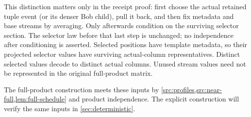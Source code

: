 \documentclass[11pt]{article} \usepackage[utf8]{inputenc}
\theoremstyle{plain} \newtheorem{theorem}{Theorem}[section]
\theoremstyle{definition} \newaliascnt{definition}{theorem}
\begin{document}
This distinction matters only in the receipt proof: first choose the
actual retained tuple event (or its denser Bob child), pull it back, and
then fix metadata and base streams by averaging. Only afterwards condition
on the surviving selector section. The selector law before that last step
is unchanged; no independence after conditioning is asserted. Selected
positions have template metadata, so their projected selector values
have surviving actual-column representatives. Distinct selected values
decode to distinct actual columns. Unused stream values need not be
represented in the original full-product matrix.

The full-product construction meets these inputs by
\cref{src:profiles,src:near-full,lem:full-schedule} and product independence.
The explicit construction will verify the same inputs in
\cref{sec:deterministic}.
\end{document}
